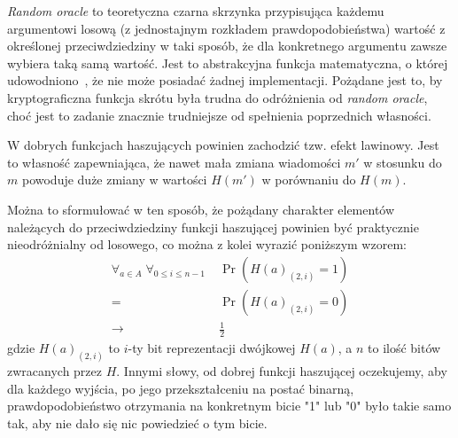 \documentclass[12pt,a4paper,twoside]{article}
\begin{document}
\textit{Random oracle} to teoretyczna czarna skrzynka przypisująca każdemu
argumentowi losową (z jednostajnym rozkładem prawdopodobieństwa) wartość z
określonej przeciwdziedziny w taki sposób, że dla konkretnego argumentu zawsze
wybiera taką samą wartość. Jest to abstrakcyjna funkcja matematyczna, o której
udowodniono~\cite{randomoracle}, że nie może posiadać żadnej implementacji.
Pożądane jest to, by kryptograficzna funkcja skrótu była trudna do odróżnienia
od \textit{random oracle}, choć jest to zadanie znacznie trudniejsze od
spełnienia poprzednich własności.

\label{sec:avalance_effect}
W dobrych funkcjach haszujących powinien zachodzić tzw. efekt lawinowy. Jest to
własność zapewniająca, że nawet mała zmiana wiadomości $m'$ w stosunku do $m$
powoduje duże zmiany w wartości $H(m')$ w porównaniu do $H(m)$.

Można to sformułować w ten sposób, że pożądany charakter elementów należących
do przeciwdziedziny funkcji haszującej powinien być praktycznie nieodróżnialny
od losowego, co można z kolei wyrazić poniższym wzorem:
$$
    \begin{aligned}
    \forall_{a \in A} \;
    \forall_{0 \leq i \leq n-1} \;
    &\Pr(H(a)_{(2,i)} = 1) \\
    =& \Pr(H(a)_{(2,i)} = 0) \\
    \to& \frac{1}{2}
    \end{aligned}
$$
gdzie $H(a)_{(2,i)}$ to $i$-ty bit reprezentacji dwójkowej $H(a)$, a $n$ to
ilość bitów zwracanych przez $H$. Innymi słowy, od dobrej funkcji haszującej
oczekujemy, aby dla każdego wyjścia, po jego przekształceniu na postać binarną,
prawdopodobieństwo otrzymania na konkretnym bicie "1" lub "0" było takie samo
tak, aby nie dało się nic powiedzieć o tym bicie.
\end{document}
